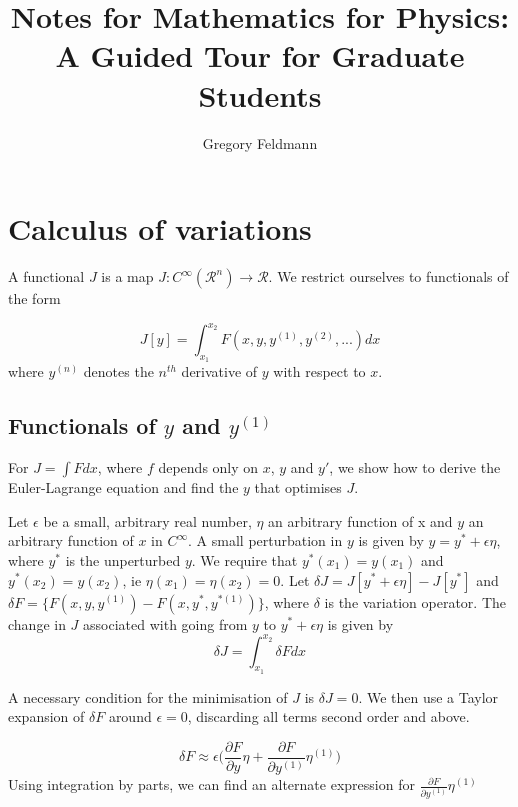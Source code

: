 \documentclass[]{article}
\title{Notes for Mathematics for Physics: A Guided Tour for Graduate Students}
\author{Gregory Feldmann}
\begin{document}
\maketitle

\tableofcontents
\newpage

\section{Calculus of variations}

A functional $J$ is a map $J:C^{\infty}(\mathcal{R}^{n}) \rightarrow \mathcal{R}$. We restrict ourselves to functionals of the form

\begin{equation} J[y] = \int_{x_{1}}^{x_{2}} F(x,y,y^{(1)},y^{(2)},...)dx \label{functional_def} \end{equation}
where $y^{(n)}$ denotes the $n^{th}$ derivative of $y$ with respect to $x$.

\subsection{Functionals of $y$ and $y^{(1)}$}

For $J=\int Fdx$, where $f$ depends only on $x$, $y$ and $y'$, we show how to derive the Euler-Lagrange equation and find the $y$ that optimises $J$. 

Let $\epsilon$ be a small, arbitrary real number, $\eta$ an arbitrary function of x and $y$ an arbitrary function of $x$ in $C^{\infty}$. A small perturbation in $y$ is given by $y = y^{*} + \epsilon \eta$, where $y^{*}$ is the unperturbed $y$. We require that $y^{*}(x_{1}) = y(x_{1})$ and $y^{*}(x_{2}) = y(x_{2})$, ie $\eta (x_{1}) = \eta(x_{2}) = 0$. Let $\delta J = J[y^{*} + \epsilon \eta] - J[y^{*}] $ and $\delta  F = \{ F(x, y, y^{(1)})-F(x,y^{*},y^{*(1)}) \}$, where $\delta$ is the variation operator. The change in $J$ associated with going from $y$ to $y^{*} + \epsilon \eta$ is given by
\begin{equation} \delta J = \int_{x_{1}}^{x_{2}} \delta  F dx \label{variational_functional_example}\end{equation}

A necessary condition for the minimisation of $J$ is $\delta J= 0$. We then use a Taylor expansion of $\delta F$ around $\epsilon = 0$, discarding all terms second order and above.

\begin{equation} \delta F \approx \epsilon \bigg(\frac{\partial F}{\partial y} \eta+ \frac{\partial F}{\partial y^{(1)}}\eta^{(1)}\bigg) \label{taylor_expansion_example} \end{equation}
Using integration by parts, we can find an alternate expression for $\frac{\partial F}{\partial y^{(1)}}\eta^{(1)}$
\end{document}

